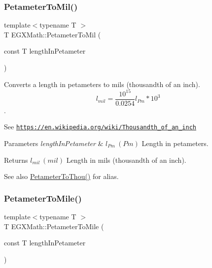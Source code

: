 \subsubsection{\texorpdfstring{Petameter\+To\+Mil()}{PetameterToMil()}}
{\footnotesize\ttfamily template$<$typename T $>$ \\
T E\+G\+X\+Math\+::\+Petameter\+To\+Mil (\begin{DoxyParamCaption}\item[{const T}]{length\+In\+Petameter }\end{DoxyParamCaption})}



Converts a length in petameters to mils (thousandth of an inch). \[ l_{mil}= \frac{10^{15}}{0.0254} l_{Pm} * 10^{3} \]. 

See \href{https://en.wikipedia.org/wiki/Thousandth_of_an_inch}{\tt https\+://en.\+wikipedia.\+org/wiki/\+Thousandth\+\_\+of\+\_\+an\+\_\+inch} 
\begin{DoxyParams}{Parameters}
{\em length\+In\+Petameter} & $ l_{Pm}\ (Pm)$ Length in petameters. \\
\hline
\end{DoxyParams}
\begin{DoxyReturn}{Returns}
$ l_{mil}\ (mil)$ Length in mils (thousandth of an inch). 
\end{DoxyReturn}
\begin{DoxySeeAlso}{See also}
\mbox{\hyperlink{group___e_g_x_math-_conversions-_length_conversions-_s_i-_petameter-_imperial_gadcb69779fdf2696d6b9e13e2b23e6216}{Petameter\+To\+Thou()}} for alias. 
\end{DoxySeeAlso}
\mbox{\label{group___e_g_x_math-_conversions-_length_conversions-_s_i-_petameter-_imperial_ga3aa40ba19c1425ed3473c605cf7d4478}} 
\subsubsection{\texorpdfstring{Petameter\+To\+Mile()}{PetameterToMile()}}
{\footnotesize\ttfamily template$<$typename T $>$ \\
T E\+G\+X\+Math\+::\+Petameter\+To\+Mile (\begin{DoxyParamCaption}\item[{const T}]{length\+In\+Petameter }\end{DoxyParamCaption})}



